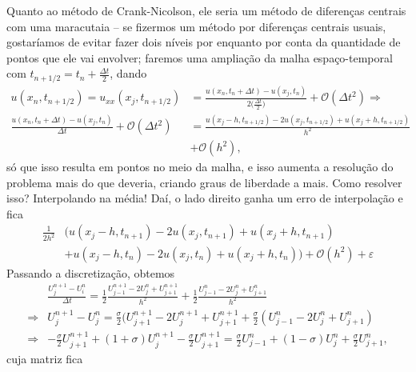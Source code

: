 \documentclass[../differential_methods.tex]{subfiles}
\begin{document}
Quanto ao método de Crank-Nicolson, ele seria um método de diferenças centrais com uma maracutaia -- se fizermos um método por diferenças centrais usuais, gostaríamos de evitar fazer dois níveis por enquanto por conta da quantidade de pontos que ele vai envolver; faremos uma ampliação da malha espaço-temporal com \(t_{n+1/2} = t_{n} + \frac{\Delta t}{2}\), dando
\begin{align*}
	u(x_{n}, t_{n+1/2}) = u_{xx}(x_{j}, t_{n+1/2})                                            & = \frac{u(x_{n}, t_{n} + \Delta t) - u(x_{j}, t_{n})}{2\bigl(\frac{\Delta t}{2}\bigr)} + \mathcal{O}(\Delta t^{2}) \Rightarrow \\
	\frac{u(x_{n}, t_{n} + \Delta t) - u(x_{j}, t_{n})}{\Delta t} + \mathcal{O}(\Delta t^{2}) & = \frac{u(x_{j}-h, t_{n+1/2})-2u(x_{j}, t_{n+1/2})+u(x_{j}+h, t_{n+1/2})}{h^{2}}                                               \\
	                                                                                          & +\mathcal{O}(h^{2}),
\end{align*}
só que isso resulta em pontos no meio da malha, e isso aumenta a resolução do problema mais do que deveria, criando graus de liberdade a mais. Como resolver isso? Interpolando na média! Daí, o lado direito ganha um erro de interpolação e fica
\begin{align*}
	\frac{1}{2h^{2}} & \biggl(u(x_{j}-h, t_{n+1})-2u(x_{j}, t_{n+1})+u(x_{j}+h, t_{n+1})                              \\
	                 & + u(x_{j}-h, t_{n})-2u(x_{j}, t_{n}) + u(x_{j}+h, t_{n})\biggr)+\mathcal{O}(h^{2})+\varepsilon
\end{align*}
Passando a discretização, obtemos
\begin{align*}
	            & \frac{U_{j}^{n+1}-U_{i}^{n}}{\Delta t} = \frac{1}{2}\frac{U_{j-1}^{n+1}-2U_{j}^{n}+U_{j+1}^{n+1}}{h^{2}} + \frac{1}{2}\frac{U_{j-1}^{n}-2U_{j}^{n}+U_{j+1}^{n}}{h^{2}}     \\
	\Rightarrow & U_{j}^{n+1}-U_{j}^{n}=\frac{\sigma }{2} (U_{j+1}^{n+1}-2U_{j}^{n+1}+U_{j+1}^{n+1}+\frac{\sigma }{2} (U_{j-1}^{n}-2U_{j}^{n}+U_{j+1}^{n})                                   \\
	\Rightarrow & -\frac{\sigma }{2}U_{j+1}^{n+1} + (1+\sigma )U_{j}^{n+1} -\frac{\sigma }{2}U_{j+1}^{n+1} = \frac{\sigma }{2}U_{j-1}^{n}+(1-\sigma )U_{j}^{n}+\frac{\sigma }{2}U_{j+1}^{n},
\end{align*}
cuja matriz fica
\end{document}

